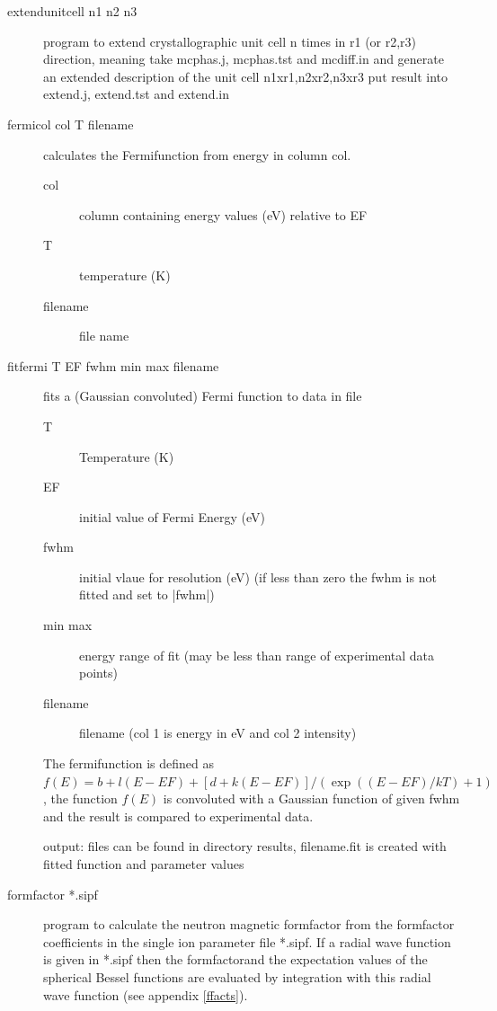 \begin{description}
\item [\prg extendunitcell n1 n2 n3]program to extend crystallographic %
unit cell n 
                times in r1 (or r2,r3) direction, meaning take mcphas.j, mcphas.tst 
                and mcdiff.in and generate an extended description of the unit %
cell 
                n1xr1,n2xr2,n3xr3 put result into extend.j, extend.tst and extend.in

\item [\prg fermicol col T filename] calculates the Fermifunction from energy in column col.
\begin{description}
\item[col] column containing energy values (eV) relative to EF
 \item[T] temperature (K)
 \item[filename] file name
\end{description}
\item[\prg fitfermi T EF fwhm min max filename] 
fits a (Gaussian convoluted) Fermi function to data in file
\begin{description}
\item[T] Temperature (K)
\item[EF] initial value of Fermi Energy (eV)
\item[fwhm] initial vlaue for resolution (eV) (if less than zero the fwhm is not fitted and set to |fwhm|)
\item[min max] energy range of fit (may be less than range of experimental data points)
\item[filename] filename (col 1 is energy in eV and col 2 intensity)
\end{description}
The fermifunction is defined as
      $ f(E)=b+l(E-EF)+[d+k(E-EF)]/(\exp((E-EF)/kT)+1)$, the function
      $ f(E)$ is convoluted with a Gaussian function of given fwhm
            and the  result is compared to experimental data.

 output:  files can be found in directory results, filename.fit is created with fitted function and parameter values
\item[\prg formfactor *.sipf] program to calculate the neutron magnetic formfactor
from the formfactor coefficients in the single ion parameter file *.sipf. If a radial wave function is given in *.sipf
then the formfactorand the expectation values of the spherical Bessel functions  are evaluated by integration
with this radial wave function (see appendix \ref{ffacts}).


\end{description}
